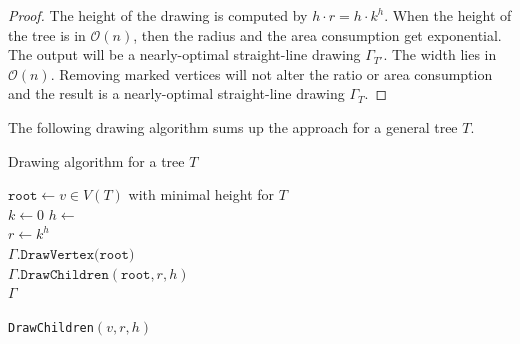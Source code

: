 \begin{proof}
	The height of the drawing is computed by $h\cdot r = h\cdot k^h$. When the height of the tree is in $\mathcal{O}(n)$, then the radius and the area consumption get exponential. The output will be a nearly-optimal straight-line drawing $\Gamma_{T'}$. The width lies in $\mathcal{O}(n)$. Removing marked vertices will not alter the ratio or area consumption and the result is a nearly-optimal straight-line drawing $\Gamma_T$.
\end{proof}

The following drawing algorithm sums up the approach for a general tree $T$.\\
\begin{algorithm}[H]
	\caption{Drawing algorithm for a tree $T$}\label{al:general_tree}
	$\texttt{root} \gets v\in V(T)$ with minimal height for $T$\\
	$k \gets 0$
	$h \gets $ \\
	$r \gets k^h$\\
	$\Gamma.\texttt{DrawVertex(root)}$\\
	$\Gamma.\texttt{DrawChildren}(\texttt{root},r,h)$\\	
	\Return $\Gamma$
\end{algorithm}

\begin{algorithm}[H]
	\caption{\texttt{DrawChildren}$(v,r,h)$}
\end{algorithm}

